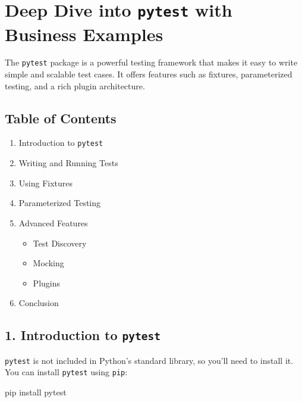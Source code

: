 \documentclass[
  letterpaper,
  DIV=11,
  numbers=noendperiod]{scrreprt}
\newenvironment{Shaded}{\begin{snugshade}}{\end{snugshade}}
\newcommand{\ExtensionTok}[1]{\textcolor[rgb]{0.00,0.23,0.31}{#1}}
\newcommand{\NormalTok}[1]{\textcolor[rgb]{0.00,0.23,0.31}{#1}}
\providecommand{\tightlist}{%
  \setlength{\itemsep}{0pt}\setlength{\parskip}{0pt}}\usepackage{longtable,booktabs,array}
\begin{document}
\section{\texorpdfstring{Deep Dive into \texttt{pytest} with Business
Examples}{Deep Dive into pytest with Business Examples}}\label{deep-dive-into-pytest-with-business-examples}

The \texttt{pytest} package is a powerful testing framework that makes
it easy to write simple and scalable test cases. It offers features such
as fixtures, parameterized testing, and a rich plugin architecture.

\subsection{Table of Contents}\label{table-of-contents-11}

\begin{enumerate}
\def\labelenumi{\arabic{enumi}.}
\tightlist
\item
  Introduction to \texttt{pytest}
\item
  Writing and Running Tests
\item
  Using Fixtures
\item
  Parameterized Testing
\item
  Advanced Features

  \begin{itemize}
  \tightlist
  \item
    Test Discovery
  \item
    Mocking
  \item
    Plugins
  \end{itemize}
\item
  Conclusion
\end{enumerate}

\subsection{\texorpdfstring{1. Introduction to
\texttt{pytest}}{1. Introduction to pytest}}\label{introduction-to-pytest}

\texttt{pytest} is not included in Python's standard library, so you'll
need to install it. You can install \texttt{pytest} using \texttt{pip}:

\begin{Shaded}
\begin{Highlighting}[]
\ExtensionTok{pip}\NormalTok{ install pytest}
\end{Highlighting}
\end{Shaded}
\end{document}

